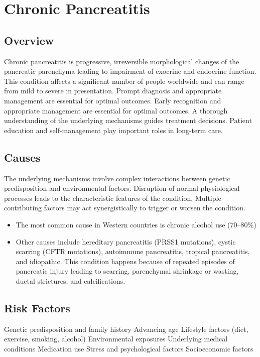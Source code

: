 \chapter{Chronic Pancreatitis}
\label{sec:Chronic Pancreatitis}

\section{Overview}
Chronic pancreatitis is progressive, irreversible morphological changes of the pancreatic parenchyma leading to impairment of exocrine and endocrine function. This condition affects a significant number of people worldwide and can range from mild to severe in presentation. Prompt diagnosis and appropriate management are essential for optimal outcomes. Early recognition and appropriate management are essential for optimal outcomes. A thorough understanding of the underlying mechanisms guides treatment decisions. Patient education and self-management play important roles in long-term care.
\section{Causes}
The underlying mechanisms involve complex interactions between genetic predisposition and environmental factors. Disruption of normal physiological processes leads to the characteristic features of the condition. Multiple contributing factors may act synergistically to trigger or worsen the condition.

\begin{itemize}[noitemsep]
  \item The most common cause in Western countries is chronic alcohol use (70--80\%)
  \item Other causes include hereditary pancreatitis (PRSS1 mutations), cystic scarring (CFTR mutations), autoimmune pancreatitis, tropical pancreatitis, and idiopathic. This condition happens because of repeated episodes of pancreatic injury leading to scarring, parenchymal shrinkage or wasting, ductal strictures, and calcifications.
\end{itemize}
\section{Risk Factors}
Genetic predisposition and family history Advancing age Lifestyle factors (diet, exercise, smoking, alcohol) Environmental exposures Underlying medical conditions Medication use Stress and psychological factors Socioeconomic factors

